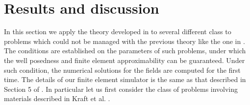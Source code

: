\section{Results and discussion}  
In this section we apply the theory developed in \cite{kalarickel2020well} to 
several different class to problems which could not be managed with the 
previous theory like the one in \cite{bianisotropi_m3as}.
The conditions are established on the parameters of such problems, 
under which the well posedness and finite element 
approximability  can be guaranteed.
Under such condition, the numerical solutions for the fields are 
computed for the first time.
The details of our finite element simulator is the same as that 
described in Section 5 of \cite{kalarickel2020well}.
In particular let us first consider the class of problems involving materials described in Kraft et al. \cite{pendry2016acsphotonics}.




